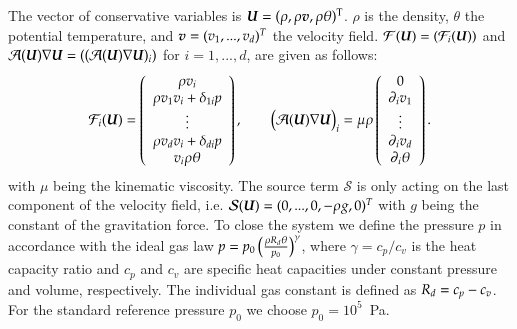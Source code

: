 \documentclass{ansarticle}
\begin{document}
The vector of conservative variables is $\boldsymbol{U}=(\rho, \rho\boldsymbol{v}, \rho\theta)^{\mathrm{T}}$.
$\rho$ is the density, $\theta$ the potential temperature, and
$\boldsymbol{v}=(v_1,...,v_d)^T$ the velocity field.
$\mathcal{F}(\boldsymbol{U}) = (\mathcal{F}_i(\boldsymbol{U}))$ and
$\mathcal{A}(\boldsymbol{U})\nabla\boldsymbol{U} = ((\mathcal{A}(\boldsymbol{U})\nabla \boldsymbol{U})_i )$ for $i=1,...,d$, are
given as follows:
\begin{equation}
   \mathcal{F}_i(\boldsymbol{U})=\left(\begin{array}{c}
    \rho v_i \\
    \rho v_1 v_i  + \delta_{1i}p \\
    \vdots \\
    \rho v_d v_i + \delta_{di} p \\
    v_i \rho\theta  \\
  \end{array}\right),\qquad 
  \big (\mathcal{A}(\boldsymbol{U})\nabla\boldsymbol{U} \big )_i =\mu\rho\left(\begin{array}{c}
    0                \\
    \partial_i v_1   \\ 
    \vdots           \\ 
    \partial_i v_d   \\
    \partial_i\theta \\
  \end{array}\right).
\end{equation}
with $\mu$ being the kinematic viscosity.
The source term $\mathcal{S}$ is only acting on the last component of the velocity field, i.e.
$\mathcal{S}(\boldsymbol{U}) = (0,...,0,-\rho g,0)^T$ with
$g$ being the constant of the gravitation force.
To close the system we define the pressure $p$ in accordance with the
ideal gas law $p = p_0\left(\frac{\rho R_d\theta}{p_0}\right)^\gamma$,
where $\gamma=c_p/c_v$ is the heat capacity ratio and $c_p$ and $c_v$ are specific
heat capacities under constant pressure and volume, respectively.
The individual gas constant is defined as $R_d=c_p-c_v$.
For the standard reference pressure $p_0$ we choose $p_0=10^5$~Pa.




\end{document}
